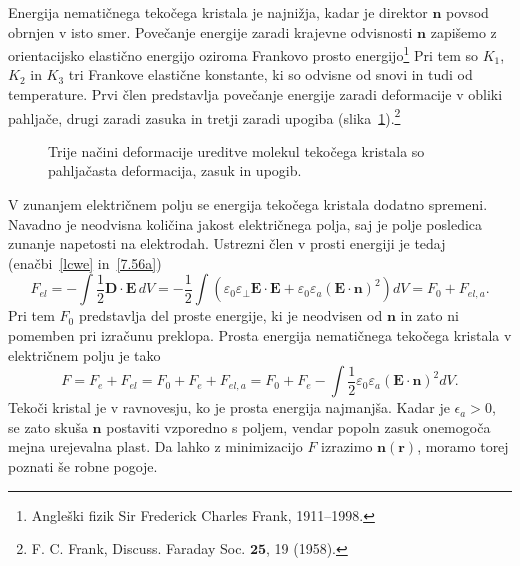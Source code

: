 Energija nematičnega tekočega kristala je najnižja, kadar je direktor $\mathbf{n}$
povsod obrnjen v isto smer. Povečanje energije zaradi krajevne odvisnosti $\mathbf{n}$
zapišemo z orientacijsko elastično energijo oziroma Frankovo prosto 
energijo\footnote{Angleški fizik Sir Frederick Charles Frank, 1911--1998.}
Pri tem so $K_{1}$, $K_{2}$ in $K_{3}$ tri Frankove elastične
konstante, ki so odvisne od snovi in tudi od temperature. 
Prvi člen predstavlja povečanje energije zaradi deformacije v obliki 
pahljače, drugi zaradi zasuka in tretji zaradi upogiba (slika~\ref{s7.20}).\footnote{F. C.
Frank, Discuss. Faraday Soc. $\mathbf{25}$, 19 (1958).}
\begin{figure}[ht]
\centering
\def\svgwidth{128truemm} 

\caption{Trije načini deformacije ureditve molekul tekočega kristala so pahljačasta deformacija,
zasuk in upogib.}
\label{s7.20}
\end{figure}

V zunanjem električnem polju se energija tekočega kristala dodatno spremeni. 
Navadno je neodvisna količina jakost električnega polja, saj je polje posledica
zunanje napetosti na elektrodah. Ustrezni člen v prosti energiji je tedaj 
(enačbi~\ref{lcwe} in~\ref{7.56a})
\begin{equation}
F_{el} = -\int \frac{1}{2} \mathbf{D}\cdot\mathbf{E}\, dV= -\frac{1}{2} \int
\left( \varepsilon_0 \varepsilon_\bot \mathbf{E}\cdot\mathbf{E} + 
\varepsilon_{0}\varepsilon_{a}(\mathbf{E}\cdot\mathbf{n})^{2}\right)dV = F_0 + F_{el,a}.
\end{equation}
Pri tem $F_{0}$ predstavlja del proste energije, ki je neodvisen od $\mathbf{n}$ in 
zato ni pomemben pri izračunu preklopa. Prosta energija
nematičnega tekočega kristala v električnem polju je tako 
\begin{equation}
F=F_e + F_{el} = F_0 + F_e + F_{el,a} = F_{0}+F_{e}-\int \frac{1}{2}\varepsilon_{0}\varepsilon_{a}
(\mathbf{E}\cdot \mathbf{n})^{2}dV.
\label{7.72}
\end{equation}
Tekoči kristal je v ravnovesju, ko je prosta energija najmanjša. Kadar je
$\epsilon_{a}>0$, se zato skuša $\mathbf{n}$ postaviti vzporedno s
poljem, vendar popoln zasuk onemogoča mejna urejevalna plast. 
Da lahko z minimizacijo $F$ izrazimo $\mathbf{n}(\mathbf{r})$, moramo
torej poznati še robne pogoje.

